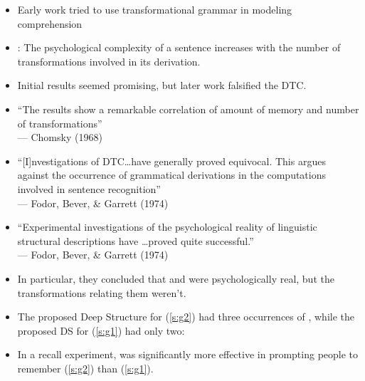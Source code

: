 \documentclass[a4paper,landscape,headrule,footrule]{foils}
\begin{document}


\begin{itemize}
\item Early work tried to use transformational grammar in 
modeling comprehension
\item {}:  The 
psychological complexity of a sentence increases 
with the number of transformations involved in its 
derivation.
\item Initial results seemed promising, but later work 
falsified the DTC.
\end{itemize}



\begin{itemize}
\item “The results show a remarkable correlation of 
amount of memory and number of transformations” 
\\ \mbox{} \hfill ---  Chomsky (1968)
\item “[I]nvestigations of DTC…have generally proved 
equivocal.  This argues against the occurrence of 
grammatical derivations in the computations 
involved in sentence recognition”                              
\\ \mbox{} \hfill --- Fodor, Bever, \& Garrett (1974)
\end{itemize}



\begin{itemize}
\item “Experimental investigations of the 
psychological reality of linguistic structural 
descriptions have \ldots proved quite successful.”                                        
\\ \mbox{} \hfill --- Fodor, Bever, \& Garrett (1974)
\item In particular, they concluded that  and  were 
psychologically real, but the transformations 
relating them weren’t.
\end{itemize}



\begin{itemize}
\item The proposed Deep Structure for (\ref{s:g2}) had three
  occurrences of , while the proposed DS for (\ref{s:g1})
  had only two:
\begin{exe}
  \ex \label{s:g1} 
  \ex \label{s:g2} 
\end{exe}
\item In a recall experiment,  was significantly more 
effective in prompting people to remember (\ref{s:g2}) than (\ref{s:g1}). 
\end{itemize}
\end{document}
